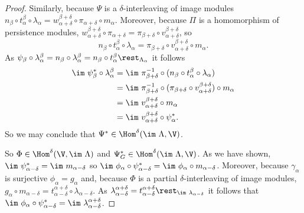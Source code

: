 \begin{proof}
  Similarly, because $\Psi$ is a $\delta$-interleaving of image modules $n_\beta\circ t_\alpha^\beta\circ \lambda_\alpha = w_{\alpha+\delta}^{\beta+\delta}\circ\pi_{\alpha+\delta}\circ m_\alpha$.
  Moreover, because $\Pi$ is a homomorphism of persistence modules, $w_{\alpha+\delta}^{\beta+\delta}\circ\pi_{\alpha+\delta} = \pi_{\beta+\delta}\circ v_{\alpha+\delta}^{\beta+\delta}$, so
  \[ n_\beta\circ t_\alpha^\beta\circ \lambda_\alpha = \pi_{\beta+\delta}\circ v_{\alpha+\delta}^{\beta+\delta}\circ m_\alpha.\]
  As $\psi_\beta\circ\lambda_\alpha^\beta = n_\beta\circ\lambda_\alpha^\beta = n_\beta\circ t_\alpha^\beta\rest_{\Lambda_\alpha}$ it follows
  \begin{align*}
    \im~\psi_\beta^*\circ\lambda_\alpha^\beta &= \im~\pi^{-1}_{\beta+\delta}\circ (n_\beta\circ t_\alpha^\beta\circ\lambda_\alpha)\\
      &= \im~\pi^{-1}_{\beta+\delta}\circ (\pi_{\beta+\delta}\circ v_{\alpha+\delta}^{\beta+\delta})\circ m_\alpha\\
      &= \im~v_{\alpha+\delta}^{\beta+\delta}\circ m_\alpha\\
      &= \im~v_{\alpha+\delta}^{\beta+\delta}\circ\psi_\alpha^*.
  \end{align*}
  So we may conclude that $\Psi^*\in\Hom^\delta(\im~\Lambda,\V)$.

  So $\Phi\in\Hom^\delta(\V,\im~\Lambda)$ and $\Psi_G^*\in\Hom^\delta(\im~\Lambda,\V)$.
  As we have shown, $\im~\psi_{\alpha-\delta}^* = \im~m_{\alpha-\delta}$ so $\im~\phi_\alpha\circ\psi_{\alpha-\delta}^* = \im~\phi_\alpha\circ m_{\alpha-\delta}$.
  Moreover, because $\gamma_\alpha$ is surjective $\phi_\alpha = g_\alpha$ and, because $\Phi$ is a partial $\delta$-interleaving of image modules, $g_\alpha\circ m_{\alpha-\delta} = t_{\alpha-\delta}^{\alpha+\delta}\circ \lambda_{\alpha-\delta}$.
  As $\lambda_{\alpha-\delta}^{\alpha+\delta} = t_{\alpha-\delta}^{\alpha+\delta}\rest_{\im~\lambda_{\alpha-\delta}}$ it follows that $\im~\phi_\alpha\circ\psi_{\alpha-\delta}^* = \im~\lambda_{\alpha-\delta}^{\alpha+\delta}$.


\end{proof}
